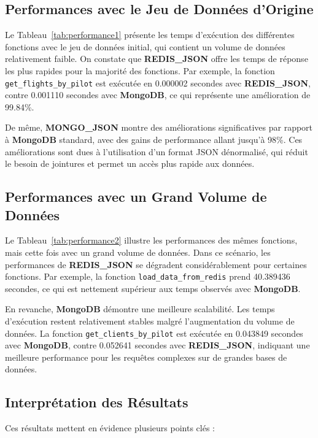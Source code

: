 \subsection{Performances avec le Jeu de Données d'Origine}

Le Tableau~\ref{tab:performance1} présente les temps d'exécution des différentes fonctions avec le jeu de données initial, qui contient un volume de données relativement faible. On constate que \textbf{REDIS\_JSON} offre les temps de réponse les plus rapides pour la majorité des fonctions. Par exemple, la fonction \texttt{get\_flights\_by\_pilot} est exécutée en 0.000002 secondes avec \textbf{REDIS\_JSON}, contre 0.001110 secondes avec \textbf{MongoDB}, ce qui représente une amélioration de 99.84\%.

De même, \textbf{MONGO\_JSON} montre des améliorations significatives par rapport à \textbf{MongoDB} standard, avec des gains de performance allant jusqu'à 98\%. Ces améliorations sont dues à l'utilisation d'un format JSON dénormalisé, qui réduit le besoin de jointures et permet un accès plus rapide aux données.

\subsection{Performances avec un Grand Volume de Données}

Le Tableau~\ref{tab:performance2} illustre les performances des mêmes fonctions, mais cette fois avec un grand volume de données. Dans ce scénario, les performances de \textbf{REDIS\_JSON} se dégradent considérablement pour certaines fonctions. Par exemple, la fonction \texttt{load\_data\_from\_redis} prend 40.389436 secondes, ce qui est nettement supérieur aux temps observés avec \textbf{MongoDB}.

En revanche, \textbf{MongoDB} démontre une meilleure scalabilité. Les temps d'exécution restent relativement stables malgré l'augmentation du volume de données. La fonction \texttt{get\_clients\_by\_pilot} est exécutée en 0.043849 secondes avec \textbf{MongoDB}, contre 0.052641 secondes avec \textbf{REDIS\_JSON}, indiquant une meilleure performance pour les requêtes complexes sur de grandes bases de données.

\subsection{Interprétation des Résultats}

Ces résultats mettent en évidence plusieurs points clés :

